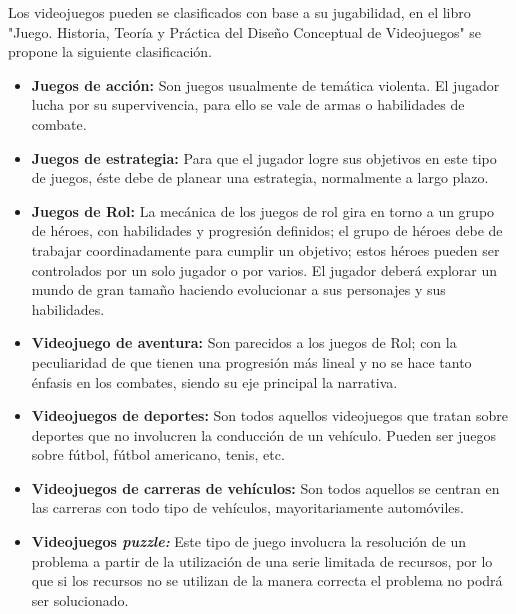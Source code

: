 Los videojuegos pueden se clasificados con base a su jugabilidad, en el libro
"Juego. Historia, Teoría y Práctica del Diseño Conceptual de
Videojuegos"\cite{Ref_JuegoDisenio} se propone la siguiente clasificación.
    \begin{itemize}
        \item \textbf{Juegos de acción:} Son juegos usualmente de temática
                violenta. El jugador lucha por su supervivencia, para ello se vale
                de armas o habilidades de  combate.
                \item \textbf{Juegos de estrategia:} Para que el jugador logre sus
                objetivos en este tipo de juegos, éste debe de planear una estrategia,
                normalmente a largo plazo.
                \item \textbf{Juegos de Rol:} La mecánica de los juegos de rol gira
                en torno a un grupo de héroes, con habilidades y progresión definidos;
                el grupo de héroes debe de trabajar coordinadamente para cumplir un
                objetivo; estos héroes pueden ser controlados por un solo jugador o
                por varios. El jugador deberá explorar un mundo de gran tamaño
                haciendo evolucionar a    sus personajes y sus habilidades.
                \item \textbf{Videojuego de aventura:} Son parecidos a los juegos de
                Rol; con la peculiaridad de que tienen una progresión más lineal y no
                se hace tanto énfasis en los combates, siendo su eje principal la
                narrativa.
                \item \textbf{Videojuegos de deportes:} Son todos aquellos videojuegos
                que tratan sobre deportes que no involucren la conducción de un
                vehículo. Pueden ser juegos sobre fútbol, fútbol americano, tenis, etc.
                \item \textbf{Videojuegos de carreras de vehículos:} Son todos aquellos
                se centran en las carreras con todo tipo de vehículos, mayoritariamente
                automóviles.
                \item \textbf{Videojuegos {\it puzzle:}} Este tipo de juego involucra
                la resolución de un problema a partir de la utilización de una serie
                limitada de recursos, por lo que si los recursos no se utilizan de la
                manera correcta el problema no podrá ser solucionado.  
    \end{itemize}
    
